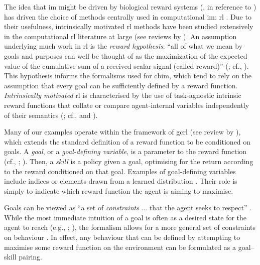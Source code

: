 \documentclass[10pt,letterpaper]{article}
\begin{document}
The idea that \gls{im} might be driven by biological reward systems (\citealp[p.~113]{barto2004intrinsically}, in reference to \citealp{kakade2002dopamine,dayan2002reward})
has driven the choice of methods centrally used in computational \gls{im}: \gls{rl} \citep[p.~252]{baldassarre2022intrinsic}. Due to their usefulness, intrinsically motivated \gls{rl} methods have been studied extensively in the computational \gls{rl} literature at large (see reviews by \citealp{colas2022autotelic,aubret2023information,lidayan2024bamdp}). An assumption underlying much work in \gls{rl} is the \emph{reward hypothesis}: ``all of what we mean by goals and purposes can well be thought of as the maximization of the expected value of the cumulative sum of a received scalar signal (called reward)'' (\citealp[p.~53]{sutton2018reinforcement}; cf., \citealp[p.~4]{silver2021reward}). This hypothesis informs the formalisms used for \gls{cbim}, which tend to rely on the assumption that every goal can be sufficiently defined by a reward function. \emph{Intrinsically motivated} \gls{rl} is characterised by the use of task-agnostic intrinsic reward functions that collate or compare agent-internal variables independently of their semantics (\citealp[p.~3]{oudeyer2008how}; cf., \citealp[p.~246]{berlyne1965structure} and \citealp{oudeyer2007what}).

Many of our examples operate within the framework of \gls{gcrl} (see review by \citealp{liu2022goal}), which extends the standard definition of a reward function to be conditioned on goals. A \textit{goal}, or a \textit{goal-defining variable}, is a parameter to the reward function (cf., \citealp[p.~1165]{colas2022autotelic}; \citealp[p.~6]{aubret2023information}). Then, a \textit{skill} is a policy given a goal, optimising for the return according to the reward conditioned on that goal. Examples of goal-defining variables include indices \citep[e.g.,][]{eysenbach2019diversity} or elements drawn from a learned distribution \citep[e.g.,][]{nair2018visual}. Their role is simply to indicate which reward function the agent is aiming to maximise.

Goals can be viewed as ``a set of \emph{constraints} ... that the agent seeks to respect'' \citep[p.~1165, emphasis in original]{colas2022autotelic}. While the most immediate intuition of a goal is often as a desired state for the agent to reach (e.g., \citealp[p.~1]{kaelbling1993learning}; \citealp[p.~2]{schaul2015universal}), the formalism allows for a more general set of constraints on behaviour \citep[pp.~22--23]{lintunen2024advancing}. In effect, any behaviour that can be defined by attempting to maximise some reward function on the environment can be formulated as a goal--skill pairing.
\end{document}
